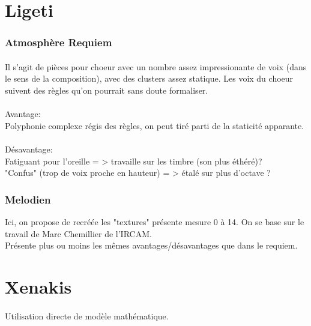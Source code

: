 \documentclass{article}
\begin{document}
  \section{Ligeti} %
  \label{sec:Ligeti}
    \subsubsection{Atmosphère Requiem} %
    \label{ssub:Atmosphère Requiem}
      \paragraph{} %
      \label{par:}
    
        Il s'agit de pièces pour choeur avec un nombre assez impressionante de voix (dans
        le sens de la composition), avec des clusters assez statique. Les voix du choeur
        suivent des règles qu'on pourrait sans doute formaliser.\\ 
        \\
        Avantage: \\
        Polyphonie complexe régis des règles, on peut tiré parti de la staticité
        apparante. \\
        \\
        Désavantage:\\
        Fatiguant pour l'oreille = > travaille sur les timbre (son plus éthéré)?\\
        "Confus" (trop de voix proche en hauteur) = > étalé sur plus d'octave ? 
    \subsubsection{Melodien} %
    \label{ssub:Melodien}
      Ici, on propose de recréée les "textures" présente mesure 0 à 14. On se base
      sur le travail de Marc Chemillier de l'IRCAM.\\
      Présente plus ou moins les mêmes avantages/désavantages que dans le requiem.
      

  \section{Xenakis} %
  \label{sec:Xenakis}
    \paragraph{} %
    \label{par:}
      Utilisation directe de modèle mathématique.
    
\end{document}
